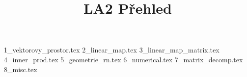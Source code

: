 \documentclass[a4paper]{article}
\begin{document}
\title{LA2 Přehled}

\maketitle
\pagebreak

{1_vektorovy_prostor.tex}
{2_linear_map.tex}
{3_linear_map_matrix.tex}
{4_inner_prod.tex}
{5_geometrie_rn.tex}
{6_numerical.tex}
{7_matrix_decomp.tex}
{8_misc.tex}
\end{document}
